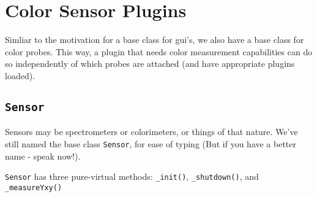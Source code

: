\section{Color Sensor Plugins}

Simliar to the motivation for a base class for gui's, we also 
have a base class for color probes. This way, a plugin that 
needs color measurement capabilities can do so independently 
of which probes are attached (and have appropriate plugins loaded).

\subsection{\tt Sensor}

Sensors may be spectrometers or colorimeters, or things of that nature.
We've still named the 
base class {\tt Sensor}, for ease of typing (But if you have 
a better name - speak now!).

{\tt Sensor} has three pure-virtual methods: 
{\tt \_init()}, {\tt \_shutdown()}, and {\tt \_measureYxy()}

